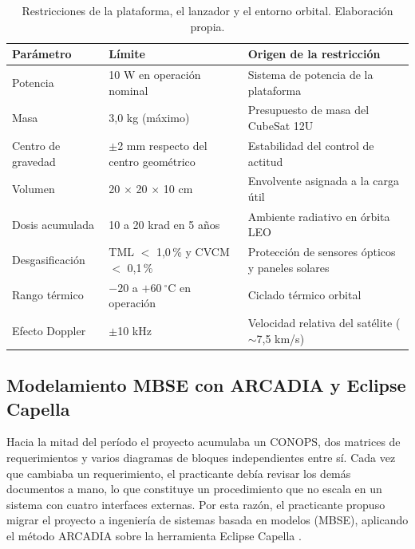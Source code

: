 \begin{table}[H]
\centering
\begin{threeparttable}
\caption{Restricciones de la plataforma, el lanzador y el entorno orbital. Elaboración propia.\vspace{1ex}}
\label{tab:restricciones}
\small
\begin{tabularx}{\textwidth}{|@{\hspace{4pt}}l l X@{\hspace{4pt}}|}
\toprule
\textbf{Parámetro} & \textbf{Límite} & \textbf{Origen de la restricción} \\
\midrule
Potencia            & 10 W en operación nominal & Sistema de potencia de la plataforma \\
Masa                & 3,0 kg (máximo)           & Presupuesto de masa del CubeSat 12U \\
Centro de gravedad  & $\pm$2 mm respecto del centro geométrico & Estabilidad del control de actitud \\
Volumen             & 20 $\times$ 20 $\times$ 10 cm & Envolvente asignada a la carga útil \\
Dosis acumulada     & 10 a 20 krad en 5 años    & Ambiente radiativo en órbita LEO \\
Desgasificación     & TML $<$ 1,0\,\% y CVCM $<$ 0,1\,\% & Protección de sensores ópticos y paneles solares \\
Rango térmico       & $-20$ a $+60\ ^{\circ}$C en operación & Ciclado térmico orbital \\
Efecto Doppler      & $\pm$10 kHz                & Velocidad relativa del satélite ($\sim$7,5 km/s) \\
\bottomrule
\end{tabularx}
\end{threeparttable}
\end{table}


\subsection{Modelamiento MBSE con ARCADIA y Eclipse Capella}

Hacia la mitad del período el proyecto acumulaba un CONOPS, dos matrices de requerimientos y varios diagramas de bloques independientes entre sí. Cada vez que cambiaba un requerimiento, el practicante debía revisar los demás documentos a mano, lo que constituye un procedimiento que no escala en un sistema con cuatro interfaces externas. Por esta razón, el practicante propuso migrar el proyecto a ingeniería de sistemas basada en modelos (MBSE), aplicando el método ARCADIA sobre la herramienta Eclipse Capella \parencite{roques}.

